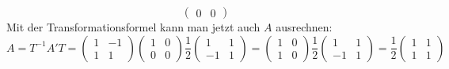 \begin{loesung}
\begin{teilaufgaben}
\[\begin{pmatrix}
0&0
\end{pmatrix}
\]
Mit der Transformationsformel kann man jetzt auch $A$ ausrechnen:
\[
A=T^{-1}A'T
=
\begin{pmatrix}
1&-1\\
1&1
\end{pmatrix}
\begin{pmatrix}
1&0\\
0&0
\end{pmatrix}
\frac12\begin{pmatrix}
1&1\\
-1&1
\end{pmatrix}
=
\begin{pmatrix}1&0\\1&0\end{pmatrix}
\frac12\begin{pmatrix}
1&1\\
-1&1
\end{pmatrix}
=
\frac12
\begin{pmatrix}
1&1\\
1&1
\end{pmatrix}
\]
\end{teilaufgaben}
\end{loesung}

